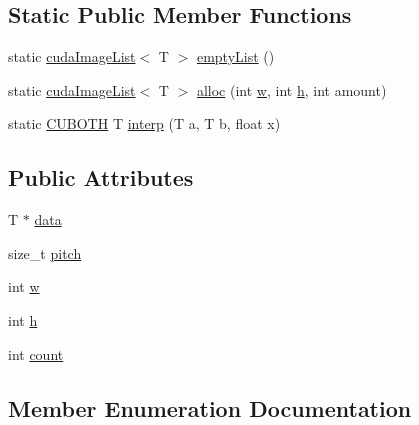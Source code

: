 \subsection*{Static Public Member Functions}
\begin{DoxyCompactItemize}
\item 
static \hyperlink{structcuda_image_list}{cuda\+Image\+List}$<$ T $>$ \hyperlink{structcuda_image_list_ae998034684c0aa6c4e0eceda64fa8e63}{empty\+List} ()
\item 
static \hyperlink{structcuda_image_list}{cuda\+Image\+List}$<$ T $>$ \hyperlink{structcuda_image_list_abfee870822f21abd6a8d5563ec26199d}{alloc} (int \hyperlink{structcuda_image_list_a1fe4adbbd48678e07c6b58f50dbe8528}{w}, int \hyperlink{structcuda_image_list_a90c8a96b431b4faa4759987f44d06123}{h}, int amount)
\item 
static \hyperlink{gpu__utils_8h_ac50b87a58396e77c6168aa6f3be3c189}{C\+U\+B\+O\+TH} T \hyperlink{structcuda_image_list_afa122427dc703d5c4a13b87d5926de20}{interp} (T a, T b, float x)
\end{DoxyCompactItemize}
\subsection*{Public Attributes}
\begin{DoxyCompactItemize}
\item 
T $\ast$ \hyperlink{structcuda_image_list_a5e32f3d282240b52b543b693723ee8ed}{data}
\item 
size\+\_\+t \hyperlink{structcuda_image_list_a5a52e30551cba6350cbedbb2eb5693b5}{pitch}
\item 
int \hyperlink{structcuda_image_list_a1fe4adbbd48678e07c6b58f50dbe8528}{w}
\item 
int \hyperlink{structcuda_image_list_a90c8a96b431b4faa4759987f44d06123}{h}
\item 
int \hyperlink{structcuda_image_list_aecc60af52765a600acbebacf2f28c0db}{count}
\end{DoxyCompactItemize}


\subsection{Member Enumeration Documentation}
